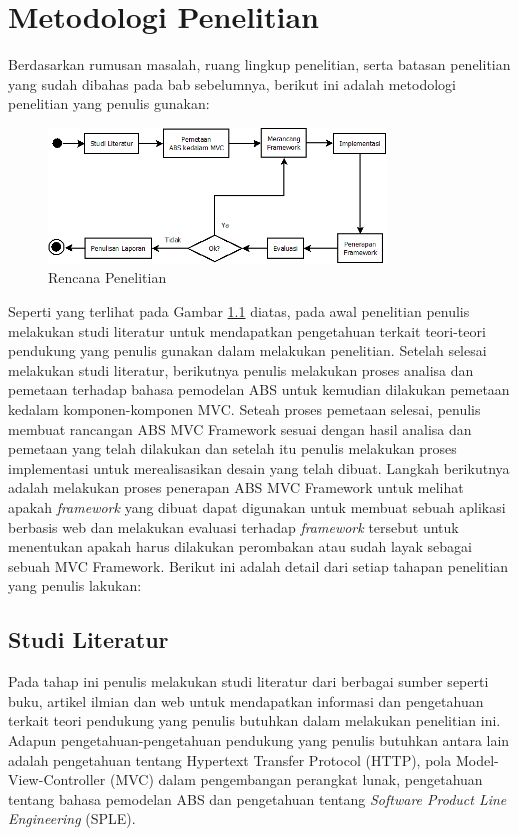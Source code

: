 \chapter{Metodologi Penelitian}

Berdasarkan rumusan masalah, ruang lingkup penelitian, serta batasan penelitian yang sudah dibahas pada bab sebelumnya, berikut ini adalah metodologi penelitian yang penulis gunakan:

\begin{figure}
    \centering
    \includegraphics[width=0.8\textwidth]
        {img/metodologi-penelitian.png}
    \caption{Rencana Penelitian}
    \label{fig:metodologiPenelitian}
\end{figure}

Seperti yang terlihat pada Gambar \ref{fig:metodologiPenelitian} diatas, pada awal penelitian penulis melakukan studi literatur untuk mendapatkan pengetahuan terkait teori-teori pendukung yang penulis gunakan dalam melakukan penelitian. Setelah selesai melakukan studi literatur, berikutnya penulis melakukan proses analisa dan pemetaan terhadap bahasa pemodelan ABS untuk kemudian dilakukan pemetaan kedalam komponen-komponen MVC. Seteah proses pemetaan selesai, penulis membuat rancangan ABS MVC Framework sesuai dengan hasil analisa dan pemetaan yang telah dilakukan dan setelah itu penulis melakukan proses implementasi untuk merealisasikan desain yang telah dibuat. Langkah berikutnya adalah melakukan proses penerapan ABS MVC Framework untuk melihat apakah \textit{framework} yang dibuat dapat digunakan untuk membuat sebuah aplikasi berbasis web dan melakukan evaluasi terhadap \textit{framework} tersebut untuk menentukan apakah harus dilakukan perombakan atau sudah layak sebagai sebuah MVC Framework. Berikut ini adalah detail dari setiap tahapan penelitian yang penulis lakukan:

\section{Studi Literatur}

Pada tahap ini penulis melakukan studi literatur dari berbagai sumber seperti buku, artikel ilmian dan web untuk mendapatkan informasi dan pengetahuan terkait teori pendukung yang penulis butuhkan dalam melakukan penelitian ini. Adapun pengetahuan-pengetahuan pendukung yang penulis butuhkan antara lain adalah pengetahuan tentang Hypertext Transfer Protocol (HTTP), pola Model-View-Controller (MVC) dalam pengembangan perangkat lunak, pengetahuan tentang bahasa pemodelan ABS dan pengetahuan tentang \textit{Software Product Line Engineering} (SPLE).

